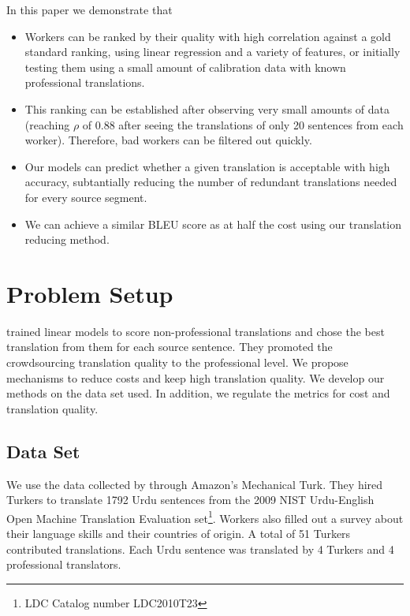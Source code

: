 \documentclass[11pt,letterpaper]{article}
\begin{document}
 In this paper we demonstrate that
 \begin{itemize}
 \item Workers can be ranked by their quality with high correlation against a gold standard ranking, using linear regression and a variety of features, or initially testing them using a small amount of calibration data with known professional translations.
 \item This ranking can be established after observing very small amounts of data (reaching $\rho$ of 0.88 after seeing the translations of only 20 sentences from each worker). Therefore, bad workers can be filtered out quickly.
 \item Our models can predict whether a given translation is acceptable with high accuracy, subtantially reducing the number of redundant translations needed for every source segment.
 \item We can achieve a similar BLEU score as  at half the cost using our translation reducing method.
 \end{itemize} 
 
\section{Problem Setup}
 trained linear models to score non-professional translations and chose the best translation from them for each source sentence. They promoted the crowdsourcing translation quality to the professional level. We propose mechanisms to  
reduce costs and keep high translation quality. We develop our methods on the data set  used. In addition, we regulate the metrics for cost and translation quality. 

\subsection{Data Set}

We use the data collected by  through Amazon's Mechanical Turk. 
They hired Turkers to translate 1792 Urdu sentences 
from the  2009 NIST Urdu-English Open Machine Translation Evaluation set\footnote{LDC Catalog number LDC2010T23}. Workers also filled out a survey about their language skills and their countries of origin.
A total of 51 Turkers contributed translations. Each Urdu sentence was translated by 4 Turkers and 4 professional translators.
\end{document}

